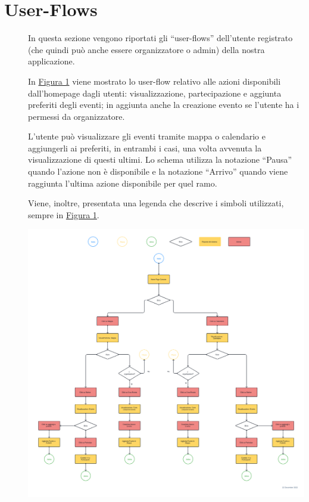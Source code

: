 \documentclass{article}
\begin{document}
\section{User-Flows}
\begin{description}
    \item[] In questa sezione vengono riportati gli “user-flows” dell'utente registrato (che quindi può anche essere organizzatore o admin) della nostra applicazione.
    \item[] In \hyperref[img:1]{Figura 1} viene mostrato lo user-flow relativo alle azioni disponibili dall'homepage dagli utenti: visualizzazione, partecipazione e aggiunta preferiti degli eventi; in aggiunta anche la creazione evento se l'utente ha i permessi da organizzatore.
    \item[] L'utente può visualizzare gli eventi tramite mappa o calendario e aggiungerli ai preferiti, in entrambi i casi, una volta avvenuta la visualizzazione di questi ultimi. Lo schema utilizza la notazione “Pausa” quando l'azione non è disponibile e la notazione “Arrivo” quando viene raggiunta l'ultima azione disponibile per quel ramo.
    \item[] Viene, inoltre, presentata una legenda che descrive i simboli utilizzati, sempre in \hyperref[img:1]{Figura 1}.
    \item[] \label{img:1} \begin{center}
            \includegraphics[scale=0.225]{User-Flow.png}
        \end{center}
\end{description}
\clearpage
\end{document}
